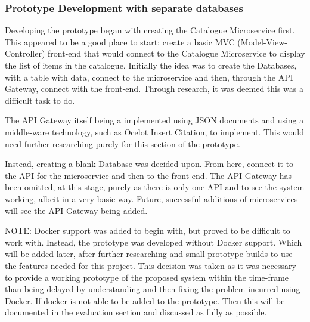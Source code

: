 \subsubsection{Prototype Development with separate databases}
Developing the prototype began with creating the Catalogue Microservice first. This appeared to be a good place to start: create a basic MVC (Model-View-Controller) front-end that would connect to the Catalogue Microservice to display the list of items in the catalogue. Initially the idea was to create the Databases, with a table with data, connect to the microservice and then, through the API Gateway, connect with the front-end. Through research, it was deemed this was a difficult task to do. 

The API Gateway itself being a implemented using JSON documents and using a middle-ware technology, such as Ocelot Insert Citation, to implement. This would need further researching purely for this section of the prototype.

Instead, creating a blank Database was decided upon. From here, connect it to the API for the microservice and then to the front-end. The API Gateway has been omitted, at this stage, purely as there is only one API and to see the system working, albeit in a very basic way. Future, successful additions of microservices will see the API Gateway being added. 

NOTE: Docker support was added to begin with, but proved to be difficult to work with. Instead, the prototype was developed without Docker support. Which will be added later, after further researching and small prototype builds to use the features needed for this project. This decision was taken as it was necessary to provide a working prototype of the proposed system within the time-frame than being delayed by understanding and then fixing the problem incurred using Docker. If docker is not able to be added to the prototype. Then this will be documented in the evaluation section and discussed as fully as possible.

